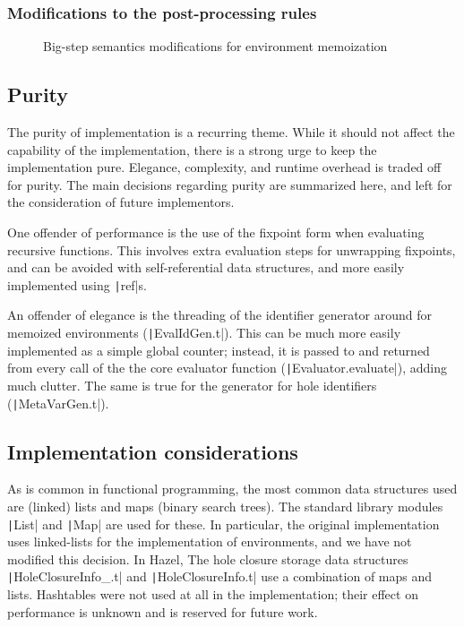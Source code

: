 \subsubsection{Modifications to the post-processing rules}
\label{sec:memoization-postprocessing}

\begin{figure}
  \centering
  \begin{mdframed}
    \begin{singlespace}
      
    \end{singlespace}
  \end{mdframed}
  \caption{Big-step semantics modifications for environment memoization}
  \label{fig:big-step-memoization-rules}
\end{figure}

\subsection{Purity}
\label{sec:env-purity}
The purity of implementation is a recurring theme. While it should not affect the capability of the implementation, there is a strong urge to keep the implementation pure. Elegance, complexity, and runtime overhead is traded off for purity. The main decisions regarding purity are summarized here, and left for the consideration of future implementors.

One offender of performance is the use of the fixpoint form when evaluating recursive functions. This involves extra evaluation steps for unwrapping fixpoints, and can be avoided with self-referential data structures, and more easily implemented using \texttt|ref|s.

An offender of elegance is the threading of the identifier generator around for memoized environments (\texttt|EvalIdGen.t|). This can be much more easily implemented as a simple global counter; instead, it is passed to and returned from every call of the the core evaluator function (\texttt|Evaluator.evaluate|), adding much clutter. The same is true for the generator for hole identifiers (\texttt|MetaVarGen.t|).

\subsection{Implementation considerations}
\label{sec:evalenv_impl_considerations}

As is common in functional programming, the most common data structures used are (linked) lists and maps (binary search trees). The standard library modules \texttt|List| and \texttt|Map| are used for these. In particular, the original implementation uses linked-lists for the implementation of environments, and we have not modified this decision. In Hazel, The hole closure storage data structures \texttt|HoleClosureInfo_.t| and \texttt|HoleClosureInfo.t| use a combination of maps and lists. Hashtables were not used at all in the implementation; their effect on performance is unknown and is reserved for future work.


